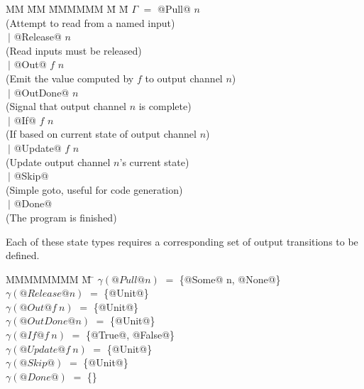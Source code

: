 \begin{tabbing}
MM \= MM \= MMMMMM \= M \= M \kill
$\Gamma$ \> $=$ \> @Pull@     \>     \> $n$         \\
         \>     \> (Attempt to read from a named input) \\

         \> $~|$\> @Release@  \>     \> $n$         \\
         \>     \> (Read inputs must be released) \\

         \> $~|$\> @Out@      \> $f$ \> $n$         \\
         \>     \> (Emit the value computed by $f$ to output channel $n$) \\

         \> $~|$\> @OutDone@  \>     \> $n$         \\
         \>     \> (Signal that output channel $n$ is complete) \\

         \> $~|$\> @If@       \> $f$ \> $n$         \\
         \>     \> (If based on current state of output channel $n$) \\

         \> $~|$\> @Update@   \> $f$ \> $n$         \\
         \>     \> (Update output channel $n$'s current state) \\

         \> $~|$\> @Skip@     \>                    \\
         \>     \> (Simple goto, useful for code generation) \\

         \> $~|$\> @Done@     \>                    \\
         \>     \> (The program is finished) \\
\end{tabbing}

Each of these state types requires a corresponding set of output transitions to be defined.
\begin{tabbing}
MMMMMMMM \= M \= \kill
$\gamma(@Pull @n)$
                            \> $=$ \> \{@Some@ n, @None@\} \\
$\gamma(@Release @n)$
                            \> $=$ \> \{@Unit@\} \\
$\gamma(@Out @   f~n)$
                            \> $=$ \> \{@Unit@\} \\
$\gamma(@OutDone @ n)$
                            \> $=$ \> \{@Unit@\} \\
$\gamma(@If @    f~n)$
                            \> $=$ \> \{@True@, @False@\} \\
$\gamma(@Update @f~n)$
                            \> $=$ \> \{@Unit@\} \\
$\gamma(@Skip@      )$
                            \> $=$ \> \{@Unit@\} \\
$\gamma(@Done@      )$
                            \> $=$ \> \{\} \\
\end{tabbing}


